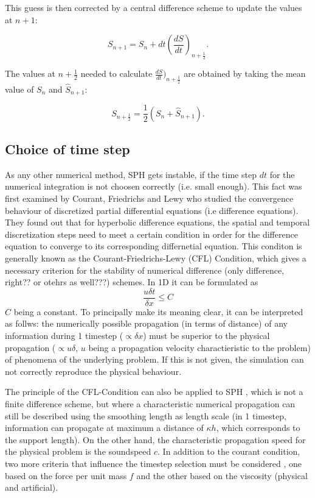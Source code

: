 \documentclass{report}
\begin{document}
This guess is then corrected by a central difference scheme to update the values at
$n+1$:

\begin{equation}
S_{n+1}=S_n+dt\left(\frac{dS}{dt}\right)_{n+\frac{1}{2}}.
\end{equation}

The values at $n+\frac{1}{2}$ needed to calculate
$\frac{dS}{dt})_{n+\frac{1}{2}}$ are obtained by taking the mean value of
$S_n$ and $\hat S_{n+1}$:

\begin{equation}
S_{n+\frac{1}{2}}=\frac{1}{2}(S_n+\hat S_{n+1}).
\end{equation}

\subsection{Choice of time step}
\label{sec:TmeStepChoice}
As any other numerical method, SPH gets instable, if the time step $dt$ for the numerical integration is not choosen correctly (i.e. small enough). 
This fact was first examined by Courant, Friedrichs and Lewy \cite{Courant1928} who studied the convergence behaviour of discretized partial differential equations (i.e difference equations). They found out that for hyperbolic difference equations, the spatial and temporal discretization steps need to meet a certain condition in order for the difference equation to converge to its  corresponding differnetial equation. This conditon is generally known as the Courant-Friedrichs-Lewy (CFL) Condition, which gives a necessary criterion for the stability of numerical difference (only difference, right?? or otehrs as well???) schemes. 
In 1D it can be formulated as
\begin{equation}
 \frac{u\delta t}{\delta x}\leq C
\end{equation}
$C$ being a constant.
To principally make its meaning clear, it can be interpreted as follws:
the numerically possible propagation (in terms of distance) of any information during 1 timestep ($\propto\delta x$) must be superior to the physical propagation ($\propto u\delta$, $u$ being a propagation velocity charactieristic to the problem) of phenomena of the underlying problem. If this is not given, the simulation can not correctly reproduce the physical behaviour. 

The principle of the CFL-Condition can also be applied to SPH \cite{Monaghan1989}, which is not a finite difference scheme, but where a characteristic numerical propagation can still be described using the smoothing length as length scale (in 1 timestep, information can propagate at maximum a distance of $\kappa h$, which corresponds to the support length). On the other hand, the characteristic propagation speed for the physical problem is the soundspeed $c$. 
In addition to the courant condition, two more criteria that influence the timestep selection must be considered \cite{Monaghan1992}, one based on the force per unit mass $f$ and the other based on the viscosity (physical and artificial).
\end{document}
